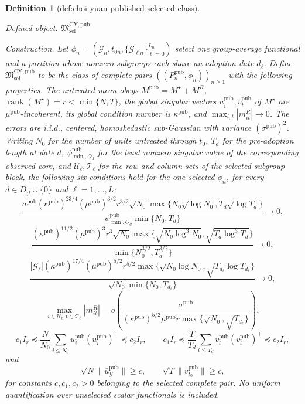 \documentclass{article}
\newtheorem{definition}{Definition}
\begin{document}
\begin{definition}[def:choi-yuan-published-selected-class]\label{def:choi-yuan-published-selected-class}
\par\smallskip\noindent\emph{Defined object.} \(\mathfrak M^{\mathrm{CY,pub}}_{\mathrm{sel}}\)
\par\smallskip\noindent\emph{Construction.} Let \(\phi_n=(\mathcal G_n,t_{0n},
\{\mathcal G_{\ell n}\}_{\ell=0}^{L_n})\) select one group-average
functional and a partition whose nonzero subgroups each share an adoption
date \(d_\ell\).  Define \(\mathfrak M^{\mathrm{CY,pub}}_{\mathrm{sel}}\)
to be the class of complete pairs \(((P_n^{\mathrm{pub}},\phi_n))_{n\ge1}\)
with the following properties.  The untreated mean obeys
\(M^{\mathrm{pub}}=M^\star+M^R\),
\(\operatorname{rank}(M^\star)=r<\min\{N,T\}\), the global singular
vectors \(u_i^{\mathrm{pub}},v_t^{\mathrm{pub}}\) of \(M^\star\) are
\(\mu^{\mathrm{pub}}\)-incoherent, its global condition number is
\(\kappa^{\mathrm{pub}}\), and
\(\max_{i,t}|m^R_{it}|\to0\).  The errors are i.i.d., centered,
homoskedastic sub-Gaussian with variance \((\sigma^{\mathrm{pub}})^2\).  Writing \(N_0\)
for the number of units untreated through \(t_0\), \(T_d\) for the
pre-adoption length at date \(d\), \(\psi^{\mathrm{pub}}_{\min,O_d}\) for the least
nonzero singular value of the corresponding observed core, and
\(\mathcal U_\ell,\mathcal T_\ell\) for the row and column sets of the
selected subgroup block, the following six conditions hold for the one
selected \(\phi_n\), for every \(d\in D_{\mathcal G}\cup\{0\}\) and
\(\ell=1,\ldots,L\):
\[
 \frac{\sigma^{\mathrm{pub}}(\kappa^{\mathrm{pub}})^{23/4}(\mu^{\mathrm{pub}})^{3/2}r^{3/2}\sqrt{N_0}
 \max\{N_0\sqrt{\log N_0},T_d\sqrt{\log T_d}\}}
 {\psi^{\mathrm{pub}}_{\min,O_d}\min\{N_0,T_d\}}\to0,
\]
\[
 \frac{(\kappa^{\mathrm{pub}})^{11/2}(\mu^{\mathrm{pub}})^3r^3\sqrt{N_0}
 \max\{\sqrt{N_0\log^3N_0},\sqrt{T_d\log^3T_d}\}}
 {\min\{N_0^{3/2},T_d^{3/2}\}}\to0,
\]
\[
 \frac{|\mathcal G_\ell|(\kappa^{\mathrm{pub}})^{17/4}(\mu^{\mathrm{pub}})^{5/2}r^{5/2}
 \max\{\sqrt{N_0\log N_0},\sqrt{T_{d_\ell}\log T_{d_\ell}}\}}
 {\sqrt{N_0}\min\{N_0,T_{d_\ell}\}}\to0,
\]
\[
 \max_{i\in\mathcal U_\ell,t\in\mathcal T_\ell}|m^R_{it}|
 =o\!\left(\frac{\sigma^{\mathrm{pub}}}
 {(\kappa^{\mathrm{pub}})^{5/2}\mu^{\mathrm{pub}}r\max\{\sqrt{N_0},\sqrt{T_{d_\ell}}\}}\right),
\]
\[
 c_1I_r\preceq\frac N{N_0}\sum_{i\le N_0}u_i^{\mathrm{pub}}(u_i^{\mathrm{pub}})^\top\preceq c_2I_r,
 \qquad
 c_1I_r\preceq\frac T{T_d}\sum_{t\le T_d}v_t^{\mathrm{pub}}(v_t^{\mathrm{pub}})^\top\preceq c_2I_r,
\]
and
\[
 \sqrt N\|\bar u^{\mathrm{pub}}_{\mathcal G}\|\ge c,
 \qquad \sqrt T\|v^{\mathrm{pub}}_{t_0}\|\ge c,
\]
for constants \(c,c_1,c_2>0\) belonging to the selected complete pair.
No uniform quantification over unselected scalar functionals is included.
\end{definition}
\end{document}
